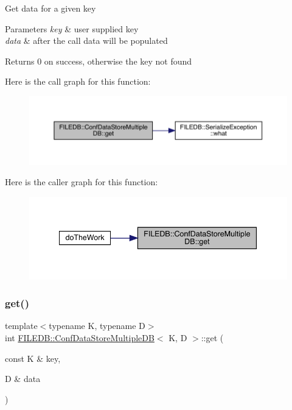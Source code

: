 Get data for a given key 
\begin{DoxyParams}{Parameters}
{\em key} & user supplied key \\
\hline
{\em data} & after the call data will be populated \\
\hline
\end{DoxyParams}
\begin{DoxyReturn}{Returns}
0 on success, otherwise the key not found 
\end{DoxyReturn}
Here is the call graph for this function\+:
\nopagebreak
\begin{figure}[H]
\begin{center}
\leavevmode
\includegraphics[width=350pt]{d3/dc0/classFILEDB_1_1ConfDataStoreMultipleDB_a15c985c05120d6076e890f0507ceade7_cgraph}
\end{center}
\end{figure}
Here is the caller graph for this function\+:\nopagebreak
\begin{figure}[H]
\begin{center}
\leavevmode
\includegraphics[width=341pt]{d3/dc0/classFILEDB_1_1ConfDataStoreMultipleDB_a15c985c05120d6076e890f0507ceade7_icgraph}
\end{center}
\end{figure}
\mbox{\label{classFILEDB_1_1ConfDataStoreMultipleDB_a15c985c05120d6076e890f0507ceade7}} 
\subsubsection{\texorpdfstring{get()}{get()}\hspace{0.1cm}{\footnotesize\ttfamily [2/2]}}
{\footnotesize\ttfamily template$<$typename K, typename D$>$ \\
int \mbox{\hyperlink{classFILEDB_1_1ConfDataStoreMultipleDB}{F\+I\+L\+E\+D\+B\+::\+Conf\+Data\+Store\+Multiple\+DB}}$<$ K, D $>$\+::get (\begin{DoxyParamCaption}\item[{const K \&}]{key,  }\item[{D \&}]{data }\end{DoxyParamCaption})\hspace{0.3cm}{\ttfamily [inline]}}

